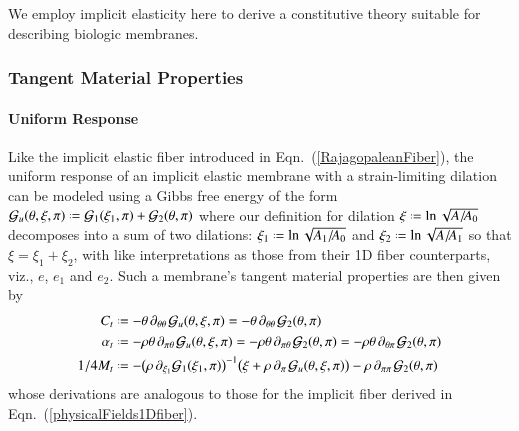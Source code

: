 We employ implicit elasticity here to derive a constitutive theory suitable for describing biologic membranes.

\subsubsection{Tangent Material Properties}

\paragraph{Uniform Response}

Like the implicit elastic fiber introduced in Eqn.~(\ref{RajagopaleanFiber}), the uniform response of an implicit elastic membrane with a strain-limiting dilation can be modeled using a Gibbs free energy of the form $\mathcal{G}_u (\theta , \xi , \pi ) \defeq \mathcal{G}_1 (\xi_1 ,\pi) + \mathcal{G}_2 (\theta , \pi)$ where our definition for dilation $\xi \defeq \ln \sqrt{A / \! A_0}$ decomposes into a sum of two dilations: $\xi_1 \defeq \ln \sqrt{A_1 / \! A_0}$ and $\xi_2 \defeq \ln \sqrt{A / \! A_1}$ so that $\xi = \xi_1 + \xi_2$, with like interpretations as those from their 1D fiber counterparts, viz., $e$, $e_1$ and $e_2$.  Such a membrane's tangent material properties are then given by
\begin{subequations}
    \label{physicalFields2Dmembrane}
    \begin{align}
    C_t & \defeq 
    -\theta \, \partial_{\theta\theta\,} 
    \mathcal{G}_u  (\theta , \xi , \pi) =
    -\theta \, \partial_{\theta\theta\,} 
    \mathcal{G}_2 (\theta , \pi)
    \label{specificHeat2Dmembrane} \\
    \alpha_t & \defeq 
    -\rho\theta \, \partial_{\pi\theta\,} 
    \mathcal{G}_u (\theta , \xi , \pi) =
    -\rho\theta \, \partial_{\pi\theta\,} 
    \mathcal{G}_2 (\theta , \pi)  =
    -\rho\theta \, \partial_{\theta\pi\,} 
    \mathcal{G}_2 (\theta , \pi)
    \label{thermalExpansion2Dmembrane} \\
    1/4M_t & \defeq -
    \bigl( \rho \, \partial_{\xi_1} \mathcal{G}_1 ( \xi_1, \pi ) \bigr)^{-1} 
    \bigl( \xi + \rho \, \partial_{\pi\,} \mathcal{G}_u (\theta , \xi , \pi ) \bigr)  -
    \rho \, \partial_{\pi\pi\,} \mathcal{G}_2(\theta , \pi)
    \label{compliance2Dmembrane}
    \end{align}
\end{subequations}
whose derivations are analogous to those for the implicit fiber derived in Eqn.~(\ref{physicalFields1Dfiber}). 

